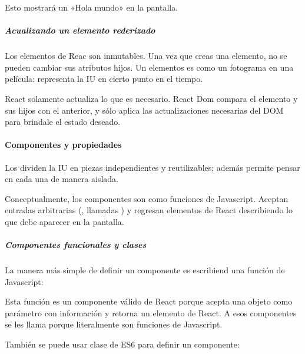 Esto mostrará un «Hola mundo» en la pantalla.


\subparagraph{Acualizando un elemento rederizado}
\label{\detokenize{reactjs:acualizando-un-elemento-rederizado}}
Los elementos de Reac son inmutables. Una vez que creas una elemento, no se
pueden cambiar sus atributos hijos. Un elementos es como un fotograma en
una película: representa la IU en cierto punto en el tiempo.

React solamente actualiza lo que es necesario. React Dom compara el elemento y
sus hijos con el anterior, y sólo aplica las actualizaciones necesarias del DOM
para brindale el estado deseado.


\paragraph{Componentes y propiedades}
\label{\detokenize{reactjs:componentes-y-propiedades}}
Los  dividen la IU en piezas independientes y reutilizables; además
permite pensar en cada una de manera aislada.

Conceptualmente, los componentes son como funciones de Javascript. Aceptan
entradas arbitrarias (,  llamadas ) y regresan elementos
de React describiendo lo que debe aparecer en la pantalla.


\subparagraph{Componentes funcionales y clases}
\label{\detokenize{reactjs:componentes-funcionales-y-clases}}
La manera más simple de definir un componente es escribiend una función
de Javascript:

%
\begin{sphinxVerbatim}[commandchars=\\\{\}]
  
      
\end{sphinxVerbatim}

Esta función es un componente válido de React porque acepta una
objeto  como parámetro con información y retorna un elemento de React.
A esos componentes se les llama  porque literalmente son funciones
de Javascript.

También se puede usar clase de ES6 para definir un componente:

